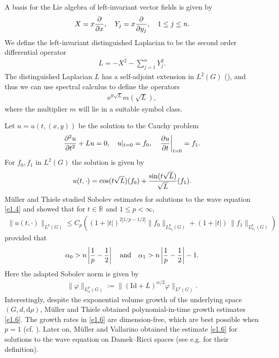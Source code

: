 \documentclass[a4paper,12pt]{amsart}
\numberwithin{equation}{section}
\theoremstyle{definition}
\theoremstyle{remark}
\numberwithin{theorem}{section}
\newcommand{\R}{\mathbb{R}}
\newcommand{\e}{\mathrm{e}}
\newcommand{\Id}{\mathrm{Id}}
\renewcommand{\i}{\mathrm{i}}
\renewcommand{\d}{\mathrm{d}}
\begin{document}
A basis for the Lie algebra of left-invariant vector fields is given by
\begin{align}\label{e1.2}
X=x{\partial\over \partial x},\quad Y_j=x{\partial\over \partial y_j},\quad 1\leq j\leq n.
\end{align}
We define the left-invariant distinguished Laplacian to be the second order differential operator
\begin{align}\label{e1.3}
L=-X^2-\sum_{j=1}^nY_j^2.
\end{align}
The distinguished Laplacian $L$ has a self-adjoint extension in $L^2(G)$ (\cite{NeSt}), and thus we can use spectral calculus to define the operators
\begin{align*}
\e^{\i t\sqrt{L}}m(\sqrt{L}),
\end{align*}
where the multiplier $m$ will lie in a suitable symbol class. 

Let $u=u(t,(x,y))$ be the solution to the Cauchy problem
\begin{align}\label{e1.4}
{\partial^2u\over\partial t^2}+Lu=0,\quad u|_{t=0}=f_0,\quad \left.{\partial u\over\partial t}\right|_{t=0}=f_1.
\end{align}
For $f_0,f_1$ in $L^2(G)$ the solution is given by
\begin{align*}
u(t,\cdot)=\cos (t\sqrt{L})(f_0)+{\sin(t\sqrt{L})\over \sqrt{L}}(f_1).
\end{align*} 
M\"{u}ller and Thiele \cite{MuTh} studied Sobolev estimates for solutions to the wave equation \eqref{e1.4} and showed that for $t\in\R$ and $1\leq p<\infty$,
\begin{align}\label{e1.6}
\|u(t,\cdot)\|_{L^p(G)}\leq C_p\left((1+|t|)^{2|1/p-1/2|}\|f_0\|_{L^p_{\alpha_0}(G)}+(1+|t|)\,\|f_1\|_{L^p_{\alpha_1}(G)}\right) 
\end{align}
provided that 
\begin{align*}
\alpha_0>n\left|{1\over p}-{1\over 2}\right|
\quad\mbox{and}\quad \alpha_1>n\left|{1\over p}-{1\over 2}\right|-1.
\end{align*}
Here the adapted Sobolev norm 
is given by 
\begin{align*}
\|\varphi\|_{L^p_\alpha(G)}:=\|(\Id+L)^{\alpha/2}\varphi\|_{L^p(G)}.
\end{align*} 
Interestingly, despite the exponential volume growth of the underlying space $(G,d,\d\rho)$, M\"{u}ller and Thiele obtained polynomial-in-time growth estimates \eqref{e1.6}. The growth rates in \eqref{e1.6} are dimension-free, which are best possible when $p=1$ (cf. \cite[Theorem 5.6]{AkKuRuZh}). Later on, M\"{u}ller and Vallarino \cite{MuVa} obtained the estimate \eqref{e1.6} for solutions to the wave equation on Damek--Ricci spaces (see e.g. \cite{ADY96} for their definition). 
\end{document}
